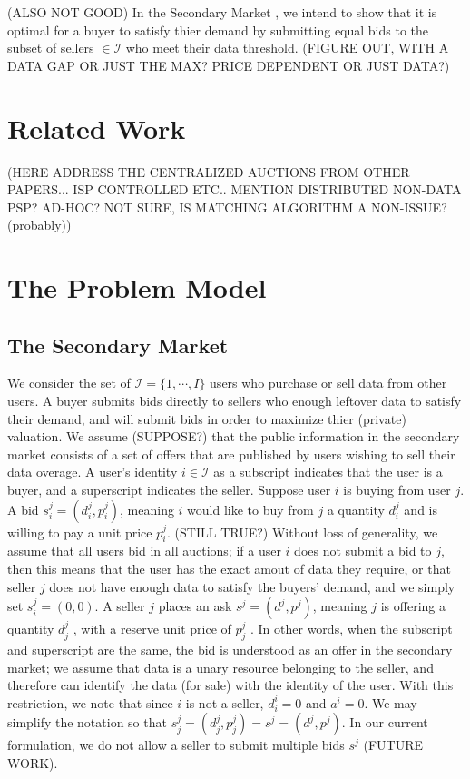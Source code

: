\documentclass[12pt]{article}
\theoremstyle{definition}
\newcommand{\mcI}{\mathcal{I}}
\begin{document}
\begin{multicols}{2}
(ALSO NOT GOOD)
In the Secondary Market \cite{zheng}, we intend to show that it is optimal for a
buyer to satisfy thier demand by submitting equal bids to the subset of sellers
$\in \mcI$ who
meet their data threshold. (FIGURE OUT, WITH A
DATA GAP OR JUST THE MAX? PRICE DEPENDENT OR JUST DATA?)

\section{Related Work}
(HERE ADDRESS THE CENTRALIZED AUCTIONS FROM OTHER PAPERS... ISP CONTROLLED
ETC.. MENTION DISTRIBUTED NON-DATA PSP? AD-HOC? NOT SURE, IS MATCHING ALGORITHM
A NON-ISSUE? (probably)) 

\section{The Problem Model}
\subsection{The Secondary Market}

We consider the set of $\mcI = \lbrace 1, \cdots, I\rbrace$ users who purchase or sell
data from other users. A buyer submits bids directly to sellers who enough leftover data
to satisfy their demand, and will submit bids in order to maximize thier
(private) valuation. We assume (SUPPOSE?) that the public information in the
secondary market consists of a set of offers that are published by users
wishing to sell their data overage. 
A user's identity $i \in \mcI$ as a subscript indicates that the user
is a buyer, and a superscript indicates the seller.
Suppose user $i$ is buying from user $j$. A bid $s_i^j = (d_i^j, p_i^j)$,
meaning $i$ would like to buy from $j$ a quantity $d^j_i$ and is willing to pay
a unit price $p^j_i$. (STILL TRUE?) Without loss of generality, we assume that all users bid in all
auctions; if a user $i$ does not submit a bid to $j$, then this means that
the user has the exact amout of data they require, or that seller $j$ does not have
enough data to satisfy the buyers' demand, and we simply set $s^j_i = (0, 0)$.
A seller $j$ places an ask $s^j = (d^j, p^j)$, meaning $j$ is offering a
quantity $d_j^j$ , with a reserve unit price of $p_j^j$ . In other words, when the subscript and
superscript are the same, the bid is understood as an offer in the secondary
market; we assume that data is a unary resource belonging to the seller, and
therefore can identify the data (for sale) with the identity of the user.
With this restriction, we note that since $i$ is not a seller, $d_i^i = 0$ and
$a^i = 0$. We may simplify the notation so that $s_j^j = (d_j^j, p_j^j) = s^j =
(d^j, p^j)$. In our current formulation, we do not allow a seller to submit
multiple bids $s^j$ (FUTURE WORK).


\end{multicols}
\end{document}
